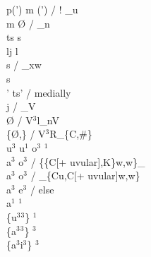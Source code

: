 \documentclass[11pt]{article}
\begin{document}
p(') m \textrightarrow\hspace{0pt} (')  / ! _u \\
m \textrightarrow\hspace{0pt} \O\hspace{0pt} / _n \\
ts \textrightarrow\hspace{0pt} s \\
l\super j \textrightarrow\hspace{0pt} l \\
s \textrightarrow\hspace{0pt}  / _x\super w \\
 \textrightarrow\hspace{0pt} s \\
' \textrightarrow\hspace{0pt} ts' / medially \\
j \textrightarrow\hspace{0pt}  / _V \\
 \textrightarrow\hspace{0pt} \O\hspace{0pt} / V$^3$l_nV \\
 \textrightarrow\hspace{0pt} \{\O,\} / V$^3$R_\{C,\#\} \\
u$^3$ u$^1$ \textrightarrow\hspace{0pt} o$^3$ $^1$ \\
a$^3$ \textrightarrow\hspace{0pt} o$^3$ / \{\{C[+ uvular],K\}\super w,w\}_ \\
a$^3$ \textrightarrow\hspace{0pt} o$^3$ / _\{Cu,C[+ uvular]\super w,w\} \\
a$^3$ \textrightarrow\hspace{0pt} e$^3$ / else \\
a$^1$ \textrightarrow\hspace{0pt} $^1$ \\
\{u$^3$\raisebox{-0.7ex}{\textasciitilde}$^3$\} \textrightarrow\hspace{0pt} $^1$ \\
\{a$^3$\raisebox{-0.7ex}{\textasciitilde}$^3$\} \textrightarrow\hspace{0pt} $^3$ \\
\{a$^3$\raisebox{-0.7ex}{\textasciitilde}i$^3$\} \textrightarrow\hspace{0pt} $^3$ \\
\end{document}
